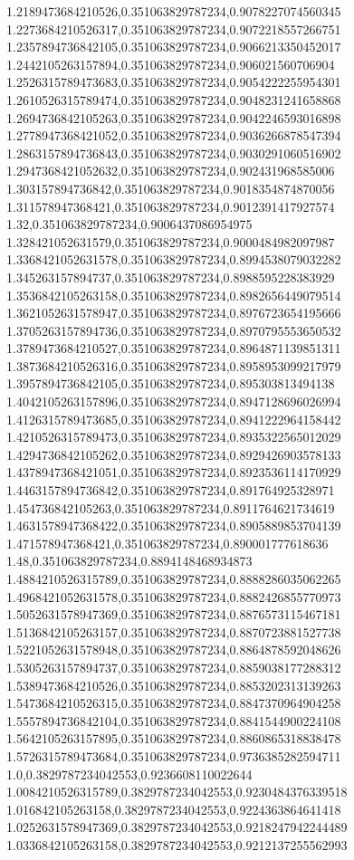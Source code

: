 1.2189473684210526,0.351063829787234,0.9078227074560345
1.2273684210526317,0.351063829787234,0.9072218557266751
1.2357894736842105,0.351063829787234,0.9066213350452017
1.2442105263157894,0.351063829787234,0.906021560706904
1.2526315789473683,0.351063829787234,0.9054222255954301
1.2610526315789474,0.351063829787234,0.9048231241658868
1.2694736842105263,0.351063829787234,0.9042246593016898
1.2778947368421052,0.351063829787234,0.9036266878547394
1.2863157894736843,0.351063829787234,0.9030291060516902
1.2947368421052632,0.351063829787234,0.902431968585006
1.303157894736842,0.351063829787234,0.9018354874870056
1.311578947368421,0.351063829787234,0.9012391417927574
1.32,0.351063829787234,0.9006437086954975
1.328421052631579,0.351063829787234,0.9000484982097987
1.3368421052631578,0.351063829787234,0.8994538079032282
1.345263157894737,0.351063829787234,0.8988595228383929
1.3536842105263158,0.351063829787234,0.8982656449079514
1.3621052631578947,0.351063829787234,0.8976723654195666
1.3705263157894736,0.351063829787234,0.8970795553650532
1.3789473684210527,0.351063829787234,0.8964871139851311
1.3873684210526316,0.351063829787234,0.8958953099217979
1.3957894736842105,0.351063829787234,0.895303813494138
1.4042105263157896,0.351063829787234,0.8947128696026994
1.4126315789473685,0.351063829787234,0.8941222964158442
1.4210526315789473,0.351063829787234,0.8935322565012029
1.4294736842105262,0.351063829787234,0.8929426903578133
1.4378947368421051,0.351063829787234,0.8923536114170929
1.4463157894736842,0.351063829787234,0.891764925328971
1.454736842105263,0.351063829787234,0.8911764621734619
1.4631578947368422,0.351063829787234,0.8905889853704139
1.471578947368421,0.351063829787234,0.890001777618636
1.48,0.351063829787234,0.8894148468934873
1.4884210526315789,0.351063829787234,0.8888286035062265
1.4968421052631578,0.351063829787234,0.8882426855770973
1.5052631578947369,0.351063829787234,0.8876573115467181
1.5136842105263157,0.351063829787234,0.8870723881527738
1.5221052631578948,0.351063829787234,0.8864878592048626
1.5305263157894737,0.351063829787234,0.8859038177288312
1.5389473684210526,0.351063829787234,0.8853202313139263
1.5473684210526315,0.351063829787234,0.8847370964904258
1.5557894736842104,0.351063829787234,0.8841544900224108
1.5642105263157895,0.351063829787234,0.8860865318838478
1.5726315789473684,0.351063829787234,0.9736385282594711
1.0,0.3829787234042553,0.9236608110022644
1.0084210526315789,0.3829787234042553,0.9230484376339518
1.016842105263158,0.3829787234042553,0.9224363864641418
1.0252631578947369,0.3829787234042553,0.9218247942244489
1.0336842105263158,0.3829787234042553,0.9212137255562993

